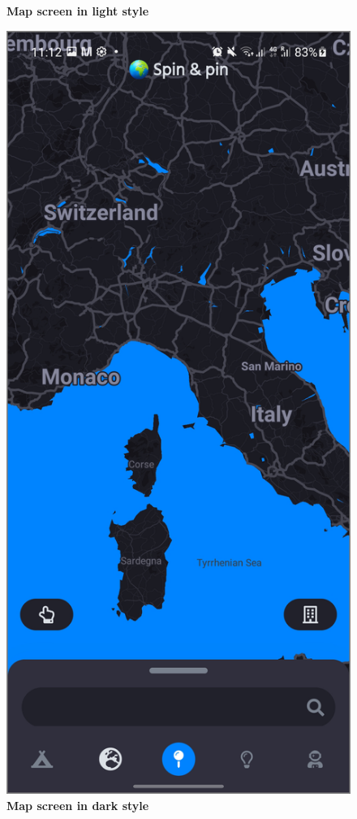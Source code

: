 \begin{figure}[!htb]
\begin{minipage}{.48\textwidth}
\caption{\label{fig:dbapiuser}\textbf{Map screen in light style}}
\end{minipage} 
\begin{minipage}{.48\textwidth}
\centering
\includegraphics[width=.9\textwidth]{../Images/UI/MapSearchDark.jpg}
\caption{\label{fig:dbapiuser}\textbf{Map screen in dark style}}
\end{minipage}
\end{figure}


